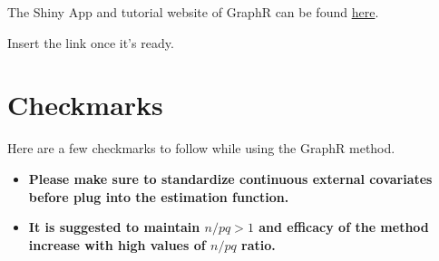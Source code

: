 \documentclass[
]{book}
\begin{document}
The Shiny App and tutorial website of GraphR can be found \href{}{here}.

Insert the link once it's ready.

\hypertarget{checkmarks}{%
\section{Checkmarks}\label{checkmarks}}

Here are a few checkmarks to follow while using the GraphR method.

\begin{itemize}
\item
  \textbf{Please make sure to standardize continuous external covariates before plug into the estimation function.}
\item
  \textbf{It is suggested to maintain \(n/pq >1\) and efficacy of the method increase with high values of \(n/pq\) ratio.}
\end{itemize}

  
\end{document}
